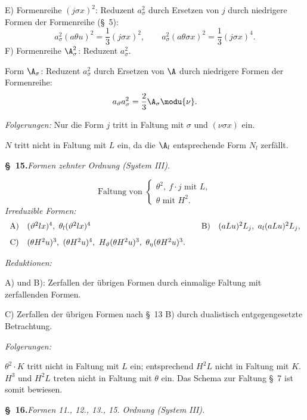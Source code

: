 E) Formenreihe $(j\sigma x)^2$: Reduzent $a_\sigma^2$ durch Ersetzen von $j$ durch niedrigere Formen der Formenreihe (\S\ 5):
\[
a_\sigma^2(a\theta u)^2=\frac13(j\sigma x)^2,
\qquad
 a_\sigma^2(a\theta\sigma x)^2=\frac13(j\sigma x)^4.
\]
F) Formenreihe $\A_\sigma^2$: Reduzent $a_\sigma^2$.

Form $\A_\sigma$: Reduzent $a_\sigma^2$ durch Ersetzen von $\A$ durch niedrigere Formen der Formenreihe:
\[
a_\vartheta a_\sigma^2=\frac23\A_\sigma\modu{\nu}.
\]

\noindent\emph{Folgerungen:} Nur die Form $j$ tritt in Faltung mit $\sigma$ und $(\nu\sigma x)$ ein.

$N$ tritt nicht in Faltung mit $L$ ein, da die $\A_l$ entsprechende Form $N_l$ zerfällt.

\begin{center}
\textbf{\S\ 15.}\quad\emph{Formen zehnter Ordnung (System III).}
\end{center}
\[
\text{Faltung von }\left\{\begin{array}{l}
\theta^2,
\ f\cdot j\text{ mit }L,\\
\theta\text{ mit }H^2.
\end{array}\right.
\]
\noindent\emph{Irreduzible Formen:}
\[
\begin{array}{c@{\quad}l@{\qquad}c@{\quad}l}
\text{A)}&(\vartheta^2lx)^4,
\ \theta_l(\vartheta^2lx)^4&
\text{B)}&(aLu)^2L_j,
\ a_l(aLu)^2L_j,\\[0.8em]
\text{C)}&(\theta H^2u)^3,
\ (\theta H^2u)^4,
\ H_\vartheta(\theta H^2u)^3,
\ \theta_\eta(\theta H^2u)^3.
\end{array}
\]

\noindent\emph{Reduktionen:}

A) und B): Zerfallen der übrigen Formen durch einmalige Faltung mit zerfallenden Formen.

C) Zerfallen der übrigen Formen nach \S\ 13 B) durch dualistisch entgegengesetzte Betrachtung.

\noindent\emph{Folgerungen:}

$\theta^2\cdot K$ tritt nicht in Faltung mit $L$ ein; entsprechend $H^2L$ nicht in Faltung mit $K$. $H^3$ und $H^2L$ treten nicht in Faltung mit $\theta$ ein. Das Schema zur Faltung \S\ 7 ist somit bewiesen.

\begin{center}
\textbf{\S\ 16.}\quad\emph{Formen 11., 12., 13., 15. Ordnung (System III).}
\end{center}

